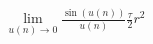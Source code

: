 \documentclass[preview]{standalone}
\begin{document}
\begin{align*}
\lim_{u(n) \to 0} \frac {\sin \left(u(n)\right)} {u(n)} \frac {\tau} {2} r^2
\end{align*}
\end{document}

